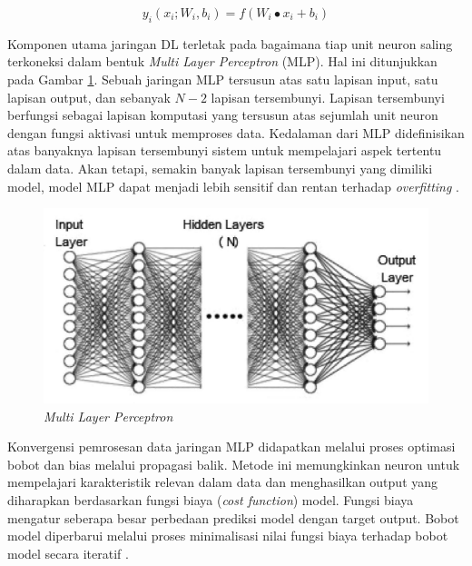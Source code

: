 \begin{equation}
    \label{neural}
    y_i(x_i;W_i, b_i) = f(W_i \bullet x_i +b_i)
\end{equation}

Komponen utama jaringan DL terletak pada bagaimana tiap unit neuron saling terkoneksi dalam bentuk \emph{Multi Layer Perceptron} (MLP). Hal ini ditunjukkan pada Gambar \ref{fig:MLP-layers}. Sebuah jaringan MLP tersusun atas satu lapisan input, satu lapisan output, dan sebanyak \(N-2\) lapisan tersembunyi. Lapisan tersembunyi berfungsi sebagai lapisan komputasi yang tersusun atas sejumlah unit neuron dengan fungsi aktivasi untuk memproses data. Kedalaman dari MLP didefinisikan atas banyaknya lapisan tersembunyi sistem untuk mempelajari aspek tertentu dalam data. Akan tetapi, semakin banyak lapisan tersembunyi yang dimiliki model, model MLP dapat menjadi lebih sensitif dan rentan terhadap \emph{overfitting} .

\begin{figure}[htbp]
    \centering
    \includegraphics[scale=0.5]{Gambar/MultiLayerPerceptron.png}
    \caption{\emph{Multi Layer Perceptron}} 
    \label{fig:MLP-layers}
\end{figure}

Konvergensi pemrosesan data jaringan MLP didapatkan melalui proses optimasi bobot dan bias melalui propagasi balik. Metode ini memungkinkan neuron untuk mempelajari karakteristik relevan dalam data dan menghasilkan output yang diharapkan berdasarkan fungsi biaya (\emph{cost function}) model. Fungsi biaya mengatur seberapa besar perbedaan prediksi model dengan target output. Bobot model diperbarui melalui proses minimalisasi nilai fungsi biaya terhadap bobot model secara iteratif .

